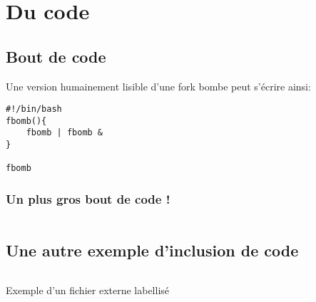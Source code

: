 \section{Du code}
\subsection{Bout de code}
Une version humainement lisible d'une fork bombe peut s'écrire ainsi:
\begin{verbatim}
#!/bin/bash
fbomb(){
    fbomb | fbomb &
}

fbomb
\end{verbatim}

\subsubsection{Un plus gros bout de code !}
\inputminted{python}{src/parts/code/example.py}
\newpage

\subsection{Une autre exemple d'inclusion de code}
\begin{listing}[ht]
    \inputminted{python}{src/parts/code/example2.py}
    \caption{Exemple d'un fichier externe labellisé}
    \label{Joli exemple}
\end{listing}
    
    